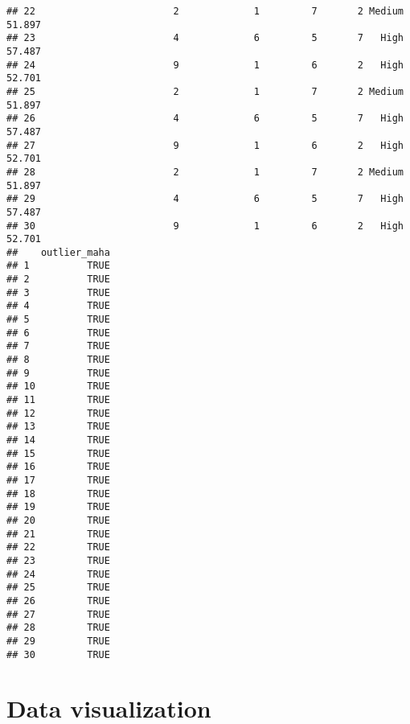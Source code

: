 \documentclass[]{article}
\newenvironment{Shaded}{\begin{snugshade}}{\end{snugshade}}
\newcommand{\KeywordTok}[1]{\textcolor[rgb]{0.13,0.29,0.53}{\textbf{#1}}}
\newcommand{\DecValTok}[1]{\textcolor[rgb]{0.00,0.00,0.81}{#1}}
\newcommand{\StringTok}[1]{\textcolor[rgb]{0.31,0.60,0.02}{#1}}
\newcommand{\CommentTok}[1]{\textcolor[rgb]{0.56,0.35,0.01}{\textit{#1}}}
\newcommand{\OtherTok}[1]{\textcolor[rgb]{0.56,0.35,0.01}{#1}}
\newcommand{\OperatorTok}[1]{\textcolor[rgb]{0.81,0.36,0.00}{\textbf{#1}}}
\newcommand{\NormalTok}[1]{#1}
\begin{document}
\begin{verbatim}
## 22                        2             1         7       2 Medium 51.897
## 23                        4             6         5       7   High 57.487
## 24                        9             1         6       2   High 52.701
## 25                        2             1         7       2 Medium 51.897
## 26                        4             6         5       7   High 57.487
## 27                        9             1         6       2   High 52.701
## 28                        2             1         7       2 Medium 51.897
## 29                        4             6         5       7   High 57.487
## 30                        9             1         6       2   High 52.701
##    outlier_maha
## 1          TRUE
## 2          TRUE
## 3          TRUE
## 4          TRUE
## 5          TRUE
## 6          TRUE
## 7          TRUE
## 8          TRUE
## 9          TRUE
## 10         TRUE
## 11         TRUE
## 12         TRUE
## 13         TRUE
## 14         TRUE
## 15         TRUE
## 16         TRUE
## 17         TRUE
## 18         TRUE
## 19         TRUE
## 20         TRUE
## 21         TRUE
## 22         TRUE
## 23         TRUE
## 24         TRUE
## 25         TRUE
## 26         TRUE
## 27         TRUE
## 28         TRUE
## 29         TRUE
## 30         TRUE
\end{verbatim}

\begin{Shaded}
\end{Shaded}

\section{Data visualization}\label{data-visualization}
\end{document}
